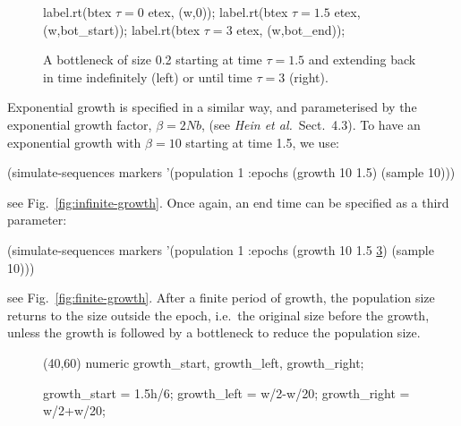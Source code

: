 \documentclass{manual}
\begin{document}
\begin{empfile}
\begin{figure}[t]
\begin{empdef}
    label.rt(btex $\tau=0$ etex,   (w,0));
    label.rt(btex $\tau=1.5$ etex, (w,bot_start));
    label.rt(btex $\tau=3$ etex,   (w,bot_end));
  \end{empdef}
  
  \hspace*{.5cm}
  \hfill
  \hspace*{.5cm}

  \caption{A bottleneck of size 0.2 starting at time $\tau=1.5$ and
    extending back in time indefinitely (left) or until time $\tau=3$
    (right).}
  \label{fig:bottlenecks}
\end{figure}


Exponential growth is specified in a similar way, and parameterised by
the exponential growth factor, $\beta=2Nb$, (see \emph{Hein
  et al.}\ Sect.~4.3).  To have an exponential growth with $\beta=10$
starting at time 1.5, we use:
\begin{code}
(simulate-sequences markers
     '(population 1 :epochs (growth 10 1.5) (sample 10)))
\end{code}
see Fig.~\ref{fig:infinite-growth}.  Once again, an end time can be
specified as a third parameter:
\begin{code}
(simulate-sequences markers
     '(population 1 :epochs (growth 10 1.5 \underline{3}) (sample 10)))
\end{code}
see Fig.~\ref{fig:finite-growth}.  After a finite period of growth,
the population size returns to the size outside the epoch, i.e.\ the
original size before the growth, unless the growth is followed by a
bottleneck to reduce the population size.

\begin{figure}[t]
  \begin{empdef}(40,60)
    numeric growth_start, growth_left, growth_right;
  
    growth_start = 1.5h/6;
    growth_left  = w/2-w/20;
    growth_right = w/2+w/20;


\end{empdef}
\end{figure}
\end{empfile}
\end{document}
